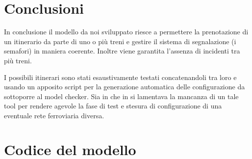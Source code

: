 \documentclass[10pt,a4paper,oneside]{report}
\begin{document}
\chapter{Conclusioni}
\label{cap:conclusions}
In conclusione il modello da noi sviluppato riesce a permettere la prenotazione di un itinerario da parte di uno o più treni e gestire il sistema di segnalazione (i semafori) in maniera coerente. Inoltre viene garantita l'assenza di incidenti tra più treni. 

I possibili itinerari sono stati esaustivamente testati concatenandoli tra loro e usando un apposito script per la generazione automatica delle configurazione da sottoporre al model checker. Sia in \cite{Paolieri} che in \cite{RossettoRocciolo} si lamentava la mancanza di un tale tool per rendere agevole la fase di test e stesura di configurazione di una eventuale rete ferroviaria diversa.

\appendix


\chapter{Codice del modello}
\label{cap:code}



\end{document}
